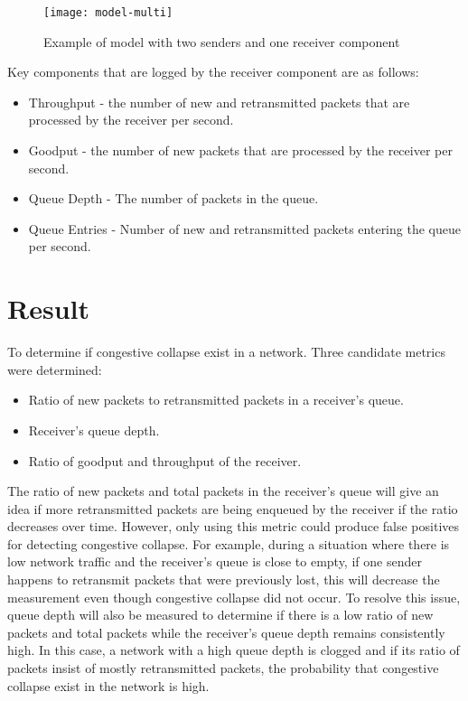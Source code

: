 \documentclass{article}
\begin{document}
\begin{figure}[H]
	\texttt{[image: model-multi]}
	\centering
	\caption{Example of model with two senders and one receiver component}
\end{figure}

Key components that are logged by the receiver component are as follows:

\begin{itemize}
	\item Throughput - the number of new and retransmitted packets that are processed by the receiver per second.
	\item Goodput - the number of new packets that are processed by the receiver per second.
	\item Queue Depth - The number of packets in the queue.
	\item Queue Entries - Number of new and retransmitted packets entering the queue per second.
\end{itemize}


\section{Result} %

To determine if congestive collapse exist in a network. Three candidate metrics were determined:

\begin{itemize}
	\item Ratio of new packets to retransmitted packets in a receiver's queue.
	\item Receiver's queue depth.
	\item Ratio of goodput and throughput of the receiver.
\end{itemize}

The ratio of new packets and total packets in the receiver's queue will give an idea if more retransmitted packets are being enqueued by the receiver if the ratio decreases over time. However, only using this metric could produce false positives for detecting congestive collapse. For example, during a situation where there is low network traffic and the receiver's queue is close to empty, if one sender happens to retransmit packets that were previously lost, this will decrease the measurement even though congestive collapse did not occur.
To resolve this issue, queue depth will also be measured to determine if there is a low ratio of new packets and total packets while the receiver's queue depth remains consistently high. In this case, a network with a high queue depth is clogged and if its ratio of packets insist of mostly retransmitted packets, the probability that congestive collapse exist in the network is high.
\end{document}
